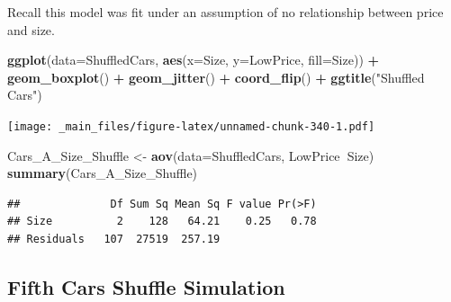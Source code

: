 \documentclass[]{book}
\newenvironment{Shaded}{\begin{snugshade}}{\end{snugshade}}
\newcommand{\KeywordTok}[1]{\textcolor[rgb]{0.13,0.29,0.53}{\textbf{#1}}}
\newcommand{\DataTypeTok}[1]{\textcolor[rgb]{0.13,0.29,0.53}{#1}}
\newcommand{\DecValTok}[1]{\textcolor[rgb]{0.00,0.00,0.81}{#1}}
\newcommand{\StringTok}[1]{\textcolor[rgb]{0.31,0.60,0.02}{#1}}
\newcommand{\OperatorTok}[1]{\textcolor[rgb]{0.81,0.36,0.00}{\textbf{#1}}}
\newcommand{\NormalTok}[1]{#1}
\begin{document}
Recall this model was fit under an assumption of no relationship between
price and size.

\begin{Shaded}
\begin{Highlighting}[]
\KeywordTok{ggplot}\NormalTok{(}\DataTypeTok{data=}\NormalTok{ShuffledCars, }\KeywordTok{aes}\NormalTok{(}\DataTypeTok{x=}\NormalTok{Size, }\DataTypeTok{y=}\NormalTok{LowPrice, }\DataTypeTok{fill=}\NormalTok{Size)) }\OperatorTok{+}\StringTok{ }
\StringTok{  }\KeywordTok{geom_boxplot}\NormalTok{() }\OperatorTok{+}\StringTok{ }\KeywordTok{geom_jitter}\NormalTok{() }\OperatorTok{+}\StringTok{ }\KeywordTok{coord_flip}\NormalTok{() }\OperatorTok{+}\StringTok{ }\KeywordTok{ggtitle}\NormalTok{(}\StringTok{"Shuffled Cars"}\NormalTok{)}
\end{Highlighting}
\end{Shaded}

\texttt{[image: \_main\_files/figure-latex/unnamed-chunk-340-1.pdf]}

\begin{Shaded}
\begin{Highlighting}[]
\NormalTok{Cars_A_Size_Shuffle <-}\StringTok{ }\KeywordTok{aov}\NormalTok{(}\DataTypeTok{data=}\NormalTok{ShuffledCars, LowPrice}\OperatorTok{~}\NormalTok{Size)}
\KeywordTok{summary}\NormalTok{(Cars_A_Size_Shuffle)}
\end{Highlighting}
\end{Shaded}

\begin{verbatim}
##              Df Sum Sq Mean Sq F value Pr(>F)
## Size          2    128   64.21    0.25   0.78
## Residuals   107  27519  257.19
\end{verbatim}

\subsection{Fifth Cars Shuffle
Simulation}\label{fifth-cars-shuffle-simulation-1}

\begin{Shaded}
\end{Shaded}
\end{document}
